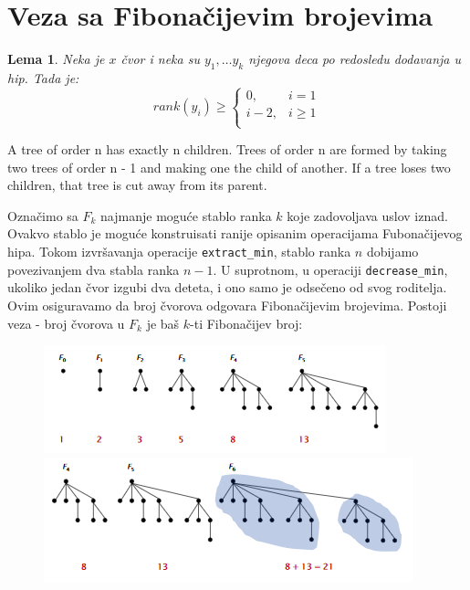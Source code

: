 \documentclass[a4paper]{article}
\theoremstyle{plain}
\newtheorem{lem}{Lema}[section] %
\theoremstyle{definition}
\begin{document}
\section{Veza sa Fibona\v{c}ijevim brojevima}
\label{sec:Fib}

\begin{lem}
    Neka je $x$ \v{c}vor i neka su $y_{1}, \dots y_{k}$ njegova deca po redosledu dodavanja u hip. Tada je:
    $$rank(y_{i}) \geq 
    \begin{cases}
        0, & i = 1\\
        i-2, & i \geq 1\\
    \end{cases}
    $$
\end{lem}

A tree of order n has exactly n children.
Trees of order n are formed by taking two trees of order n - 1 and making one the child of another.
If a tree loses two children, that tree is cut away from its parent.

Ozna\v{c}imo sa $F_{k}$ najmanje mogu\'c{}e stablo ranka $k$ koje zadovoljava uslov iznad. Ovakvo stablo je mogu\'{c}e konstruisati ranije opisanim operacijama Fubona\v{c}ijevog hipa. Tokom izvr\v{s}avanja operacije \texttt{extract\_min}, stablo ranka $n$ dobijamo povezivanjem dva stabla ranka $n - 1$. U suprotnom, u operaciji \texttt{decrease\_min}, ukoliko jedan \v{c}vor izgubi dva deteta, i ono samo je odse\v{c}eno od svog roditelja. Ovim osiguravamo da broj \v{c}vorova odgovara Fibona\v{c}ijevim brojevima. Postoji veza - broj \v{c}vorova u $F_{k}$ je ba\v{s} $k$-ti Fibona\v{c}ijev broj:
\begin{figure}[H]
    \centering
    \includegraphics[scale=0.85]{resources/fig6a.PNG}\\
    \includegraphics[scale=0.85]{resources/fig6b.PNG}
\end{figure}
\end{document}
